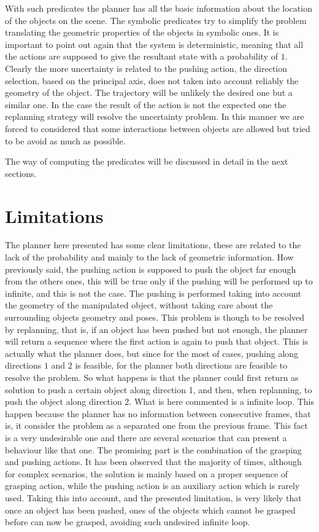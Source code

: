 \mbox{}


With such predicates the planner has all the basic information about the location of the objects on the scene. The symbolic predicates try to simplify the problem translating the geometric properties of the objects in symbolic ones. It is important to point out again that the system is deterministic, meaning that all the actions are supposed to give the resultant state with a probability of $1$. Clearly the more uncertainty is related to the pushing action, the direction selection, based on the principal axis, does not taken into account reliably the geometry of the object. The trajectory will be unlikely the desired one but a similar one. In the case the result of the action is not the expected one the replanning strategy will resolve the uncertainty problem. In this manner we are forced to considered that some interactions between objects are allowed but tried to be avoid as much as possible. 

\mbox{}

The way of computing the predicates will be discussed in detail in the next sections.



\section{Limitations}
The planner here presented has some clear limitations, these are related to the lack of the probability and mainly to the lack of geometric information. 
How previously said, the pushing action is supposed to push the object far enough from the others ones, this will be true only if the pushing will be performed up to infinite, and this is not the case. The pushing is performed taking into account the geometry of the manipulated object, without taking care about the surrounding objects geometry and poses. This problem is though to be resolved by replanning, that is, if an object has been pushed but not enough, the planner will return a sequence where the first action is again to push that object. This is actually what the planner does, but since for the most of cases, pushing along directions $1$ and $2$ is feasible, for the planner both directions are feasible to resolve the problem. So what happens is that the planner could first return as solution to push a certain object along direction 1, and then, when replanning, to push the object along direction 2. What is here commented is a infinite loop. This happen because the planner has no information between consecutive frames, that is, it consider the problem as a separated one from the previous frame. 
This fact is a very undesirable one and there are several scenarios that can present a behaviour like that one. The promising part is the combination of the grasping and pushing actions. It has been observed that the majority of times, although for complex scenarios, the solution is mainly based on a proper sequence of grasping action, while the pushing action is an auxiliary action which is rarely used. Taking this into account, and the presented limitation, is very likely that once an object has been pushed, ones of the objects which cannot be grasped before can now be grasped, avoiding such undesired infinite loop.  



